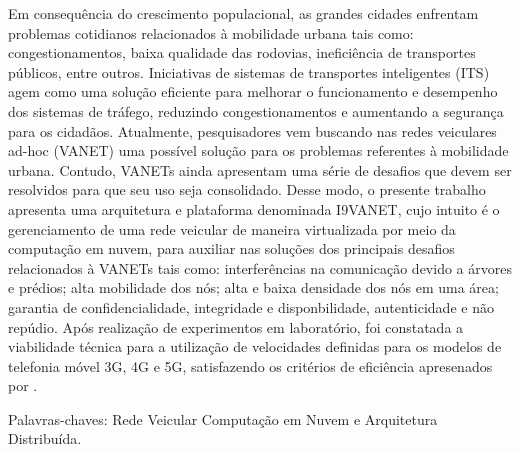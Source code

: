 \documentclass[
	12pt,				%
	oneside,			%
	a4paper,			%
	english,			%
	brazil				%
	]{abntex2ppgsi}
\begin{document}
\begin{resumo}
Em consequência do crescimento populacional, as grandes cidades enfrentam problemas cotidianos relacionados à mobilidade urbana tais como: congestionamentos, baixa qualidade das rodovias, ineficiência de transportes públicos, entre outros. Iniciativas de sistemas de transportes inteligentes (ITS) agem como uma solução eficiente para melhorar o funcionamento e desempenho dos sistemas de tráfego, reduzindo congestionamentos e aumentando a segurança para os cidadãos. Atualmente, pesquisadores vem buscando nas redes veiculares ad-hoc (VANET) uma possível solução para os problemas referentes à mobilidade urbana. Contudo, VANETs ainda apresentam uma série de desafios que devem ser resolvidos para que seu uso seja consolidado.  Desse modo, o presente trabalho apresenta uma arquitetura e plataforma denominada I9VANET, cujo intuito é o gerenciamento de uma rede veicular de maneira virtualizada por meio da computação em nuvem, para auxiliar nas soluções dos principais desafios relacionados à VANETs tais como: interferências na comunicação devido a árvores e prédios;  alta mobilidade dos nós; alta e baixa densidade dos nós em uma área; garantia de confidencialidade, integridade e disponbilidade, autenticidade e não repúdio. Após realização de experimentos em laboratório, foi constatada a viabilidade técnica para a utilização de velocidades definidas para os modelos de telefonia móvel 3G, 4G e 5G, satisfazendo os critérios de eficiência apresenados por .
 
Palavras-chaves: Rede Veicular Computação em Nuvem e Arquitetura Distribuída.

\end{resumo}
\end{document}
